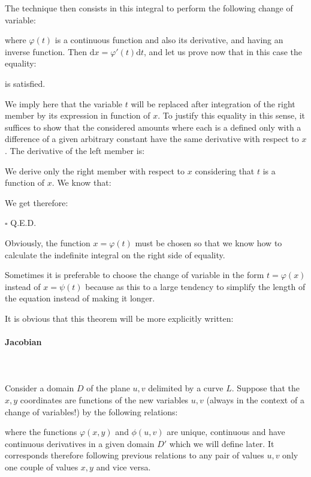 	The technique then consists in this integral to perform the following change of variable:
	
	where $\varphi (t)$ is a continuous function and also its derivative, and having an inverse function. Then $\mathrm{d}x=\varphi' (t)\mathrm{d}t$, and let us prove now that in this case the equality:	
	
	is satisfied.
	\begin{dem}
	We imply here that the variable $t$ will be replaced after integration of the right member by its expression in function of $x$. To justify this equality in this sense, it suffices to show that the considered amounts where each is a defined only with a difference of a given arbitrary constant have the same derivative with respect to $x$. The derivative of the left member is:
	
	We derive only the right member with respect to $x$ considering that $t$ is a function of $x$. We know that:
	
	We get therefore:
	
	\begin{flushright}
		$\square$  Q.E.D.
	\end{flushright}
	\end{dem}
	Obviously, the function $x=\varphi (t)$ must be chosen so that we know how to calculate the indefinite integral on the right side of equality.
	\begin{tcolorbox}[title=Remark,colframe=black,arc=10pt]
	Sometimes it is preferable to choose the change of variable in the form $t=\varphi (x)$ instead of $x= \psi(t)$ because as this to a large tendency to simplify the length of the equation instead of making it longer.
	\end{tcolorbox}
	It is obvious that this theorem will be more explicitly written:
	
	
	\pagebreak
	\paragraph{Jacobian}\mbox{}\\\\
	Consider a domain $D$ of the plane  $u,v$ delimited by a curve $L$. Suppose that the $x, y$ coordinates are functions of the new variables $u, v$ (always in the context of a change of variables!) by the following relations:
	
	where the functions $\varphi (x,y)$ and $\phi(u,v)$ are unique, continuous and have continuous derivatives in a given domain $D'$ which we will define later. It corresponds therefore following previous relations to any pair of values $u, v$ only one couple of values $x, y$ and vice versa.
	
